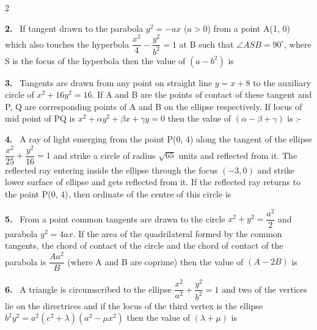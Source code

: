 \documentclass[10pt]{extarticle}
\newcommand{\qn}[1]{\par\smallskip\noindent\textbf{#1.}~}
\begin{document}
\begin{multicols}{2}
\qn{2} If tangent drawn to the parabola $y^2=-ax$ ($a>0$) from a point A(1, 0) which also touches the hyperbola $\dfrac{x^2}{4}-\dfrac{y^2}{b^2}=1$ at B such that $\angle ASB=90^\circ$, where S is the focus of the hyperbola then the value of $(a-b^2)$ is
\qn{3} Tangents are drawn from any point on straight line $y=x+8$ to the auxiliary circle of $x^2+16y^2=16$. If A and B are the points of contact of these tangent and P, Q are corresponding points of A and B on the ellipse respectively. If locus of mid point of PQ is $x^2+\alpha y^2+\beta x+\gamma y=0$ then the value of $(\alpha-\beta+\gamma)$ is :-
\qn{4} A ray of light emerging from the point P(0, 4) along the tangent of the ellipse $\dfrac{x^2}{25}+\dfrac{y^2}{16}=1$ and strike a circle of radius $\sqrt{65}$ units and reflected from it. The reflected ray entering inside the ellipse through the focus $(-3,0)$ and strike lower surface of ellipse and gets reflected from it. If the reflected ray returns to the point P(0, 4), then ordinate of the centre of this circle is
\qn{5} From a point common tangents are drawn to the circle $x^2+y^2=\dfrac{a^2}{2}$ and parabola $y^2=4ax$. If the area of the quadrilateral formed by the common tangents, the chord of contact of the circle and the chord of contact of the parabola is $\dfrac{Aa^2}{B}$ (where A and B are coprime) then the value of $(A-2B)$ is
\qn{6} A triangle is circumscribed to the ellipse $\dfrac{x^2}{a^2}+\dfrac{y^2}{b^2}=1$ and two of the vertices lie on the directrices and if the locus of the third vertex is the ellipse $b^2y^2=a^2(e^2+\lambda)(a^2-\mu x^2)$ then the value of $(\lambda+\mu)$ is

\end{multicols}
\end{document}
